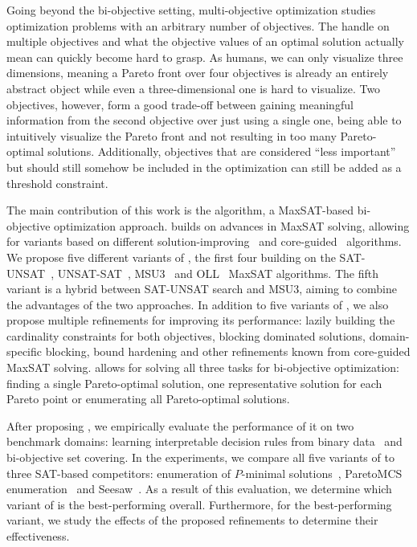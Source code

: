 Going beyond the bi-objective setting, multi-objective optimization studies optimization problems with an arbitrary number of objectives.
The handle on multiple objectives and what the objective values of an optimal solution actually mean can quickly become hard to grasp.
As humans, we can only visualize three dimensions, meaning a Pareto front over four objectives is already an entirely abstract object while even a three-dimensional one is hard to visualize.
Two objectives, however, form a good trade-off between gaining meaningful information from the second objective over just using a single one, being able to intuitively visualize the Pareto front and not resulting in too many Pareto-optimal solutions.
Additionally, objectives that are considered ``less important'' but should still somehow be included in the optimization can still be added as a threshold constraint.

The main contribution of this work is the \algname{} algorithm, a MaxSAT-based bi-objective optimization approach.
\algname{} builds on advances in MaxSAT solving, allowing for variants based on different solution-improving~\autocites{handbook2-maxsat,DBLP:journals/jsat/BerreP10,DBLP:journals/jsat/EenS06} and core-guided~\autocites{DBLP:journals/corr/abs-0712-1097,DBLP:conf/sat/AnsoteguiBL09,DBLP:conf/cp/MorgadoDM14,DBLP:journals/jsat/IgnatievMM19} algorithms.
We propose five different variants of \algname{}, the first four building on the SAT-UNSAT~\autocite{DBLP:journals/jsat/BerreP10}, UNSAT-SAT~\autocite{DBLP:conf/sat/FuM06}, MSU3~\autocite{DBLP:journals/corr/abs-0712-1097} and OLL~\autocite{DBLP:conf/cp/MorgadoDM14} MaxSAT algorithms.
The fifth variant is a hybrid between SAT-UNSAT search and MSU3, aiming to combine the advantages of the two approaches.
In addition to five variants of \algname{}, we also propose multiple refinements for improving its performance:
lazily building the cardinality constraints for both objectives, blocking dominated solutions, domain-specific blocking, bound hardening and other refinements known from core-guided MaxSAT solving.
\algname{} allows for solving all three tasks for bi-objective optimization:
finding a single Pareto-optimal solution, one representative solution for each Pareto point or enumerating all Pareto-optimal solutions.

After proposing \algname{}, we empirically evaluate the performance of it on two benchmark domains:
learning interpretable decision rules from binary data~\autocite{DBLP:conf/cp/MaliotovM18} and bi-objective set covering.
In the experiments, we compare all five variants of \algname{} to three SAT-based competitors:
enumeration of $P$-minimal solutions~\autocite{DBLP:conf/cp/SohBTB17}, ParetoMCS enumeration~\autocite{DBLP:conf/ijcai/Terra-NevesLM18a} and Seesaw~\autocite{DBLP:conf/cp/JanotaMSM21}.
As a result of this evaluation, we determine which variant of \algname{} is the best-performing overall.
Furthermore, for the best-performing variant, we study the effects of the proposed refinements to determine their effectiveness.

